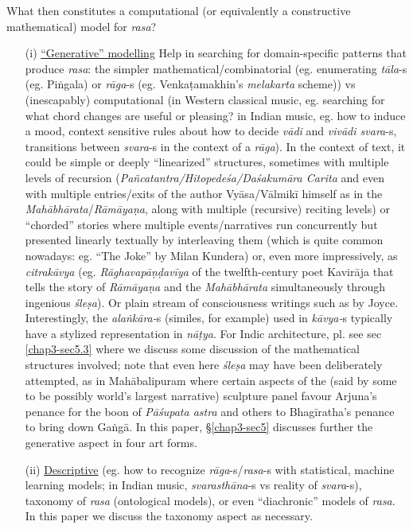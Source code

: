 What then constitutes a computational (or equivalently a constructive mathematical) model for \textsl{rasa}?
\begin{itemize}
\item[(i)] \underline{“Generative” modelling} Help in searching for domain-specific patterns that produce \textsl{rasa}: the simpler mathematical/combi\-natorial (eg. enumerating \textsl{tāla}-s (eg. Piṅgala) or \textsl{rāga}-s (eg. Venkaṭamakhin's \textsl{melakarta} scheme)) vs (inescapably) computational (in Western classical music, eg. searching for what chord changes are useful or pleasing? in Indian music, eg. how to induce a mood, context sensitive rules about how to decide \textsl{vādi} and \textsl{vivādi svara}-s, transitions between \textsl{svara}-s in the context of a \textsl{rāga}). In the context of text, it could be simple or deeply “linearized” structures, sometimes with multiple levels of recursion (\textsl{Pañcatantra/Hitopedeśa/Daśakumāra Carita} and even with multiple entries/exits of the author Vyāsa/Vālmikī himself as in the \textsl{Mahābhārata}/\textsl{Rāmāyaṇa}, along with multiple (recursive) reciting levels) or “chorded” stories where multiple events/narratives run concurrently but presented linearly textually by interleaving them (which is quite common nowadays: eg. “The Joke” by Milan Kundera) or, even more impressively, as \textsl{citrakāvya} (eg. \textsl{Rāghavapāṇḍavīya} of the twelfth-century poet Kavirāja that tells the story of \textsl{Rāmāyaṇa} and the \textsl{Mahābhārata} simultaneously through ingenious \textsl{śleṣa}). Or plain stream of consciousness writings such as by Joyce. Interestingly, the \textsl{alaṅkāra-}s (similes, for example) used in \textsl{kāvya-}s typically have a stylized representation in \textsl{nāṭya}. For Indic architecture, pl. see sec \ref{chap3-sec5.3} where we discuss some discussion of the mathematical structures involved; note that even here \textsl{śleṣa} may have been deliberately attempted, as in Mahābalipuram where certain aspects of the (said by some to be possibly world's largest narrative) sculpture panel favour Arjuna’s penance for the boon of \textsl{Pāśupata astra} and others to Bhagīratha’s penance to bring down Gaṅgā. In this paper, \S\ref{chap3-sec5} discusses further the generative aspect in four art forms.

\item[(ii)] \underline{Descriptive} (eg. how to recognize \textsl{rāga}-s/\textsl{rasa}-s with statistical, machine learning models; in Indian music, \textsl{svarasthāna}-s vs reality of \textsl{svara}-s), taxonomy of \textsl{rasa} (ontological models), or even “diachronic” models of \textsl{rasa}. In this paper we discuss the taxonomy aspect as necessary.


\end{itemize}

